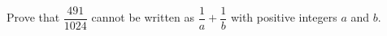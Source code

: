 Prove that $\dfrac{491}{1024}$ cannot be written as $\dfrac{1}{a}+\dfrac{1}{b}$ with positive integers $a$ and $b$.
